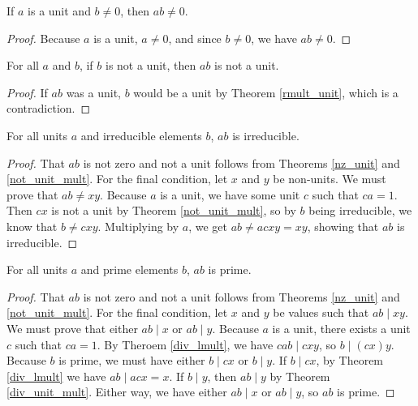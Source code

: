 \documentclass[../../math.tex]{subfiles}
\begin{document}
\begin{theorem} \label{nz_unit}
    If $a$ is a unit and $b \neq 0$, then $ab \neq 0$.
\end{theorem}
\begin{proof}
    Because $a$ is a unit, $a \neq 0$, and since $b \neq 0$, we have $ab \neq
    0$.
\end{proof}

\begin{theorem} \label{not_unit_mult}
    For all $a$ and $b$, if $b$ is not a unit, then $ab$ is not a unit.
\end{theorem}
\begin{proof}
    If $ab$ was a unit, $b$ would be a unit by Theorem \ref{rmult_unit}, which
    is a contradiction.
\end{proof}

\begin{theorem} \label{irreducible_unit}
    For all units $a$ and irreducible elements $b$, $ab$ is irreducible.
\end{theorem}
\begin{proof}
    That $ab$ is not zero and not a unit follows from Theorems \ref{nz_unit} and
    \ref{not_unit_mult}.  For the final condition, let $x$ and $y$ be non-units.
    We must prove that $ab \neq xy$.  Because $a$ is a unit, we have some unit
    $c$ such that $ca = 1$.  Then $cx$ is not a unit by Theorem
    \ref{not_unit_mult}, so by $b$ being irreducible, we know that $b \neq cxy$.
    Multiplying by $a$, we get $ab \neq acxy = xy$, showing that $ab$ is
    irreducible.
\end{proof}

\begin{theorem} \label{prime_unit}
    For all units $a$ and prime elements $b$, $ab$ is prime.
\end{theorem}
\begin{proof}
    That $ab$ is not zero and not a unit follows from Theorems \ref{nz_unit} and
    \ref{not_unit_mult}.  For the final condition, let $x$ and $y$ be values
    such that $ab \mid xy$.  We must prove that either $ab \mid x$ or $ab \mid
    y$.  Because $a$ is a unit, there exists a unit $c$ such that $ca = 1$.  By
    Theroem \ref{div_lmult}, we have $cab \mid cxy$, so $b \mid (cx)y$.  Because
    $b$ is prime, we must have either $b \mid cx$ or $b \mid y$.  If $b \mid
    cx$, by Theorem \ref{div_lmult} we have $ab \mid acx = x$.  If $b \mid y$,
    then $ab \mid y$ by Theorem \ref{div_unit_mult}.  Either way, we have either
    $ab \mid x$ or $ab \mid y$, so $ab$ is prime.
\end{proof}
\end{document}
